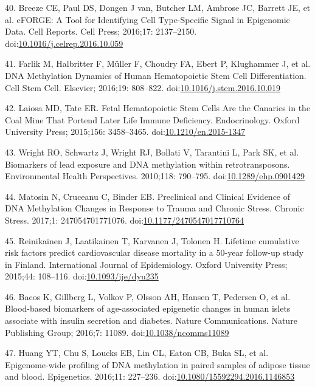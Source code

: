 \documentclass[]{article}
\theoremstyle{definition}
\theoremstyle{definition}
\theoremstyle{definition}
\theoremstyle{remark}
\begin{document}
40. Breeze CE, Paul DS, Dongen J van, Butcher LM, Ambrose JC, Barrett
JE, et al. eFORGE: A Tool for Identifying Cell Type-Specific Signal in
Epigenomic Data. Cell Reports. Cell Press; 2016;17: 2137--2150.
doi:\href{http://dx.doi.org/10.1016/j.celrep.2016.10.059}{10.1016/j.celrep.2016.10.059}

41. Farlik M, Halbritter F, M{ü}ller F, Choudry FA, Ebert P, Klughammer
J, et al. DNA Methylation Dynamics of Human Hematopoietic Stem Cell
Differentiation. Cell Stem Cell. Elsevier; 2016;19: 808--822.
doi:\href{http://dx.doi.org/10.1016/j.stem.2016.10.019}{10.1016/j.stem.2016.10.019}

42. Laiosa MD, Tate ER. Fetal Hematopoietic Stem Cells Are the Canaries
in the Coal Mine That Portend Later Life Immune Deficiency.
Endocrinology. Oxford University Press; 2015;156: 3458--3465.
doi:\href{http://dx.doi.org/10.1210/en.2015-1347}{10.1210/en.2015-1347}

43. Wright RO, Schwartz J, Wright RJ, Bollati V, Tarantini L, Park SK,
et al. Biomarkers of lead exposure and DNA methylation within
retrotransposons. Environmental Health Perspectives. 2010;118: 790--795.
doi:\href{http://dx.doi.org/10.1289/ehp.0901429}{10.1289/ehp.0901429}

44. Matosin N, Cruceanu C, Binder EB. Preclinical and Clinical Evidence
of DNA Methylation Changes in Response to Trauma and Chronic Stress.
Chronic Stress. 2017;1: 247054701771076.
doi:\href{http://dx.doi.org/10.1177/2470547017710764}{10.1177/2470547017710764}

45. Reinikainen J, Laatikainen T, Karvanen J, Tolonen H. Lifetime
cumulative risk factors predict cardiovascular disease mortality in a
50-year follow-up study in Finland. International Journal of
Epidemiology. Oxford University Press; 2015;44: 108--116.
doi:\href{http://dx.doi.org/10.1093/ije/dyu235}{10.1093/ije/dyu235}

46. Bacos K, Gillberg L, Volkov P, Olsson AH, Hansen T, Pedersen O, et
al. Blood-based biomarkers of age-associated epigenetic changes in human
islets associate with insulin secretion and diabetes. Nature
Communications. Nature Publishing Group; 2016;7: 11089.
doi:\href{http://dx.doi.org/10.1038/ncomms11089}{10.1038/ncomms11089}

47. Huang YT, Chu S, Loucks EB, Lin CL, Eaton CB, Buka SL, et al.
Epigenome-wide profiling of DNA methylation in paired samples of adipose
tissue and blood. Epigenetics. 2016;11: 227--236.
doi:\href{http://dx.doi.org/10.1080/15592294.2016.1146853}{10.1080/15592294.2016.1146853}
\end{document}
